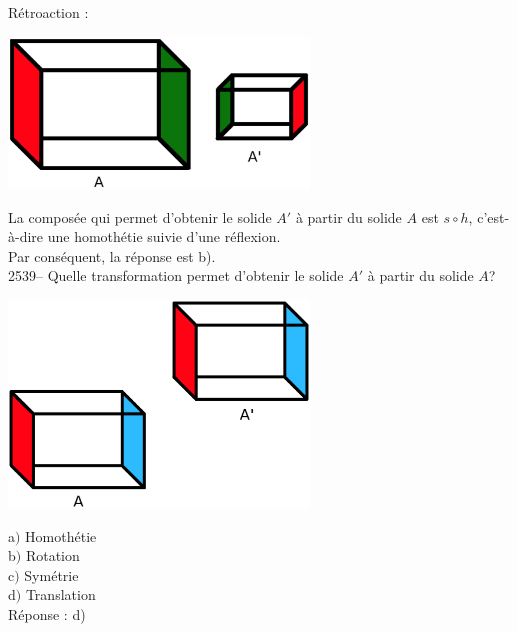 \documentclass[letterpaper, 12pt]{article}
\begin{document}
R\'etroaction :\\
\begin{center}
 \includegraphics[width=8cm,bb=14 14 517 296]{Q2538.eps}
\end{center}
La compos\'ee qui permet d'obtenir le solide $A'$ \`a partir du solide $A$ est $s\circ h$, c'est-\`a-dire une homoth\'etie suivie d'une r\'eflexion. \\
Par cons\'equent, la r\'eponse est b).\\

2539--   Quelle transformation permet d'obtenir le solide $A'$ \`a partir du solide $A$?\\
\begin{center}
 \includegraphics[width=8cm,bb=14 14 699 527]{Q2539.eps}
\end{center}

a$)$ Homoth\'etie\\
b$)$ Rotation\\
c$)$ Sym\'etrie\\
d$)$ Translation\\

R\'eponse : d)\\
\end{document}
